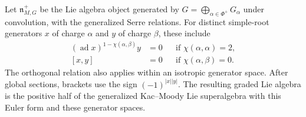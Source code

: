 Let $\mathfrak n^+_{M,G}$ be the Lie algebra object generated by $G=\bigoplus_{\alpha\in\Phi^+}G_\alpha$ under convolution, with the generalized Serre relations.
For distinct simple-root generators $x$ of charge $\alpha$ and $y$ of charge $\beta$, these include
\[
 \begin{aligned}
 (\operatorname{ad}x)^{1-\chi(\alpha,\beta)}y&=0
       &&\text{if }\chi(\alpha,\alpha)=2,\\
 [x,y]&=0&&\text{if }\chi(\alpha,\beta)=0.
 \end{aligned}
\]
The orthogonal relation also applies within an isotropic generator space.
After global sections, brackets use the sign $(-1)^{|x||y|}$.
The resulting graded Lie algebra is the positive half of the generalized Kac--Moody Lie superalgebra with this Euler form and these generator spaces.

